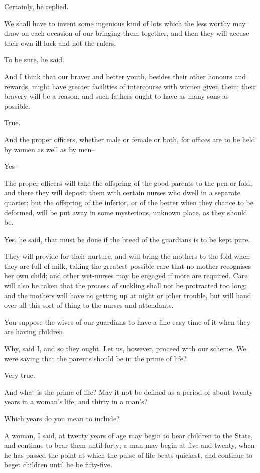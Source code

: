 Certainly, he replied.

We shall have to invent some ingenious kind of lots which the less
worthy may draw on each occasion of our bringing them together, and then
they will accuse their own ill-luck and not the rulers.

To be sure, he said.

And I think that our braver and better youth, besides their other
honours and rewards, might have greater facilities of intercourse with
women given them; their bravery will be a reason, and such fathers ought
to have as many sons as possible.

True.

And the proper officers, whether male or female or both, for offices are
to be held by women as well as by men--

Yes--

The proper officers will take the offspring of the good parents to the
pen or fold, and there they will deposit them with certain nurses who
dwell in a separate quarter; but the offspring of the inferior, or of
the better when they chance to be deformed, will be put away in some
mysterious, unknown place, as they should be.

Yes, he said, that must be done if the breed of the guardians is to be
kept pure.

They will provide for their nurture, and will bring the mothers to the
fold when they are full of milk, taking the greatest possible care that
no mother recognises her own child; and other wet-nurses may be engaged
if more are required. Care will also be taken that the process of
suckling shall not be protracted too long; and the mothers will have no
getting up at night or other trouble, but will hand over all this sort
of thing to the nurses and attendants.

You suppose the wives of our guardians to have a fine easy time of it
when they are having children.

Why, said I, and so they ought. Let us, however, proceed with our
scheme. We were saying that the parents should be in the prime of life?

Very true.

And what is the prime of life? May it not be defined as a period of
about twenty years in a woman's life, and thirty in a man's?

Which years do you mean to include?

A woman, I said, at twenty years of age may begin to bear children to
the State, and continue to bear them until forty; a man may begin at
five-and-twenty, when he has passed the point at which the pulse of life
beats quickest, and continue to beget children until he be fifty-five.

